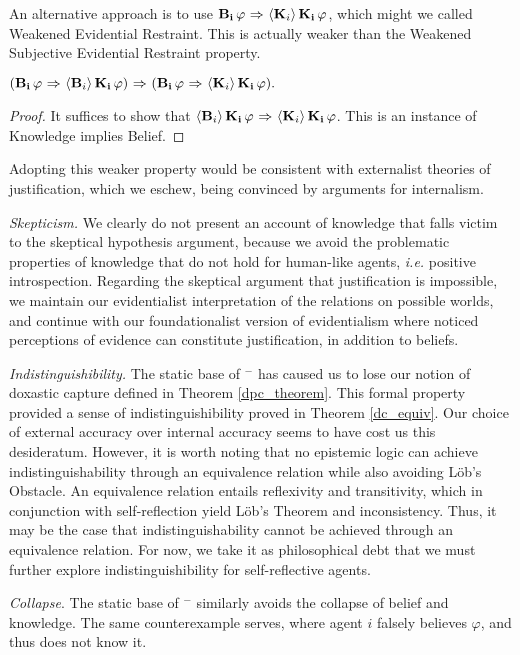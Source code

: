 An alternative approach is to use $\mathbf{B}_{\mathbf{i}}\,\varphi {\ \Rightarrow \ } \langle \mathbf{K}_{i} \rangle\,\mathbf{K}_{\mathbf{i}}\,\varphi$, which might we called Weakened Evidential Restraint. This is actually weaker than the Weakened Subjective Evidential Restraint property.

\begin{theorem}\label{wser_wer}
	$\\ (\mathbf{B}_{\mathbf{i}}\,\varphi {\ \Rightarrow \ } \langle \mathbf{B}_{i} \rangle\,\mathbf{K}_{\mathbf{i}}\,\varphi)
	{\ \Rightarrow \ } (\mathbf{B}_{\mathbf{i}}\,\varphi {\ \Rightarrow \ } \langle \mathbf{K}_{i} \rangle\,\mathbf{K}_{\mathbf{i}}\,\varphi).$
\end{theorem}
\begin{proof}
	It suffices to show that $\langle \mathbf{B}_{i} \rangle\,\mathbf{K}_{\mathbf{i}}\,\varphi {\ \Rightarrow \ } \langle \mathbf{K}_{i} \rangle\,\mathbf{K}_{\mathbf{i}}\,\varphi$. This is an instance of Knowledge implies Belief.
\end{proof}
Adopting this weaker property would be consistent with externalist theories of justification, which we eschew, being convinced by arguments for internalism.

\emph{Skepticism. }We clearly do not present an account of knowledge that falls victim to the skeptical hypothesis argument, because we avoid the problematic properties of knowledge that do not hold for human-like agents, \emph{i.e.} positive introspection. Regarding the skeptical argument that justification is impossible, we maintain our evidentialist interpretation of the relations on possible worlds, and continue with our foundationalist version of evidentialism where noticed perceptions of evidence can constitute justification, in addition to beliefs.

\emph{Indistinguishibility. } The static base of \DASL$^-$ has caused us to lose our notion of doxastic capture defined in Theorem \ref{dpc_theorem}. This formal property provided a sense of indistinguishibility proved in Theorem \ref{dc_equiv}. Our choice of external accuracy over internal accuracy seems to have cost us this desideratum. However, it is worth noting that no epistemic logic can achieve indistinguishability through an equivalence relation while also avoiding L\"ob's Obstacle. An equivalence relation entails reflexivity and transitivity, which in conjunction with self-reflection yield L\"ob's Theorem and inconsistency. Thus, it may be the case that indistinguishability cannot be achieved through an equivalence relation. For now, we take it as philosophical debt that we must further explore indistinguishibility for self-reflective agents.

\emph{Collapse}. The static base of \DASL$^-$ similarly avoids the collapse of belief and knowledge. The same counterexample serves, where agent $i$ falsely believes $\varphi$, and thus does not know it.

